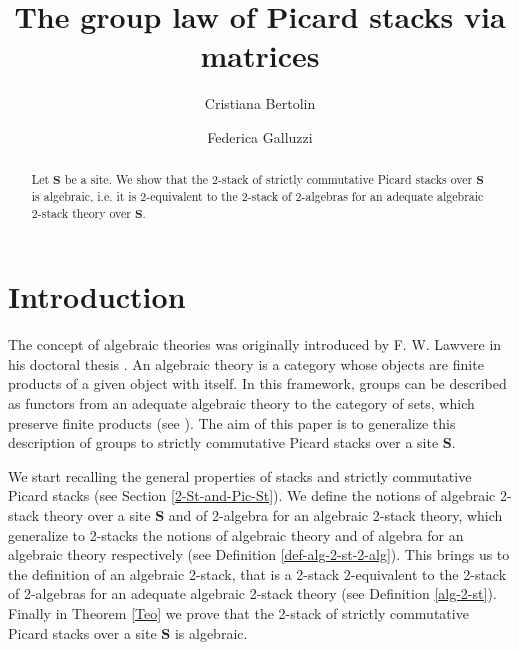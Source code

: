 \documentclass[11pt]{amsart}
\newcommand{\bS}{\textbf{S}}
\theoremstyle{definition}
\numberwithin{equation}{section}
\begin{document}
\title[The group law of Picard stacks via matrices]
{The group law of Picard stacks via matrices}


\author{Cristiana Bertolin}
\address{Dipartimento di Matematica, Universit\`a di Padova, Via Trieste 63, Italy}

\author{Federica Galluzzi}
\address{Dipartimento di Matematica, Universit\`a di Torino, Via Carlo Alberto 10, Italy}



\begin{abstract}
	Let $\bS$ be a site. We show that the 2-stack of strictly commutative Picard stacks over $\bS$ is algebraic, i.e. it is 2-equivalent to the 2-stack of 2-algebras for an adequate algebraic 2-stack theory over $\bS$.
\end{abstract}

\maketitle
\tableofcontents

\section*{Introduction}



The concept of algebraic theories was originally introduced by F. W. Lawvere in his doctoral thesis \cite{La}. An algebraic theory is a category whose
objects are finite products of a given object with itself. In this framework, groups can be described as functors from an adequate algebraic theory to the category of sets, which preserve finite products (see \cite{AdRoVi}).
The aim of this paper is to generalize this description of groups to strictly commutative Picard stacks over a site $\bS.$

We start recalling
 the general properties of stacks and strictly commutative Picard stacks (see Section \ref{2-St-and-Pic-St}). We define the notions of algebraic 2-stack theory over a site $\bS$ and of 2-algebra for an algebraic 2-stack theory, which  
  generalize to 2-stacks the notions of algebraic theory and of algebra for an algebraic theory respectively (see Definition \ref{def-alg-2-st-2-alg}).
This brings us to the definition of an algebraic 2-stack, that is a 2-stack 2-equivalent to the 2-stack of 2-algebras for an adequate algebraic 2-stack theory (see Definition \ref{alg-2-st}). Finally in Theorem \ref{Teo} we prove that the 2-stack of strictly commutative Picard stacks over a site $\bS$ is algebraic.
\end{document}
